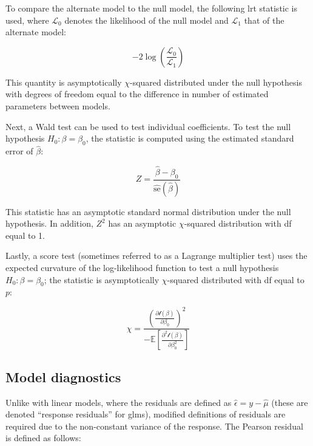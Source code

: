 \documentclass{report}
\begin{document}
To compare the alternate model to the null model, the following \gls{lrt} statistic is used, where $\mathcal{L}_0$ denotes the likelihood of the null model and $\mathcal{L}_1$ that of the alternate model:

\begin{equation}\label{eq:glm-lrt-statistic-nested}
    -2\log\left(\frac{\mathcal{L}_0}{\mathcal{L}_1}\right)
\end{equation}

This quantity is asymptotically $\chi$-squared distributed under the null hypothesis with degrees of freedom equal to the difference in number of estimated parameters between models. 

Next, a Wald test can be used to test individual coefficients. To test the null hypothesis $H_0: \beta = \beta_0$, the statistic is computed using the estimated standard error of $\hat{\beta}$:

\begin{equation}\label{eq:glm-z-statistic}
    Z = \frac{\hat{\beta} - \beta_0}{\widehat{\text{se}}\left(\hat{\beta}\right)}
\end{equation}

This statistic has an asymptotic standard normal distribution under the null hypothesis. In addition, $Z^2$ has an asymptotic $\chi$-squared distribution with \gls{df} equal to 1. 

Lastly, a score test (sometimes referred to as a Lagrange multiplier test) uses the expected curvature of the log-likelihood function to test a null hypothesis $H_0: \beta = \beta_0$; the statistic is asymptotically $\chi$-squared distributed with \gls{df} equal to $p$:

\begin{equation}\label{eq:glm-score-statistic}
    \chi = \frac{\left(\frac{\partial\mathcal{l}(\beta)}{\partial\beta_0}\right)^2}{-\mathbb{E}\left[\frac{\partial^2\mathcal{l}(\beta)}{\partial\beta_0^2}\right]}
\end{equation}

\subsection{Model diagnostics}

Unlike with linear models, where the residuals are defined as $\hat{\epsilon} = y - \hat{\mu}$ (these are denoted ``response residuals'' for \glspl{glm}), modified definitions of residuals are required due to the non-constant variance of the response. The Pearson residual is defined as follows:
\end{document}
